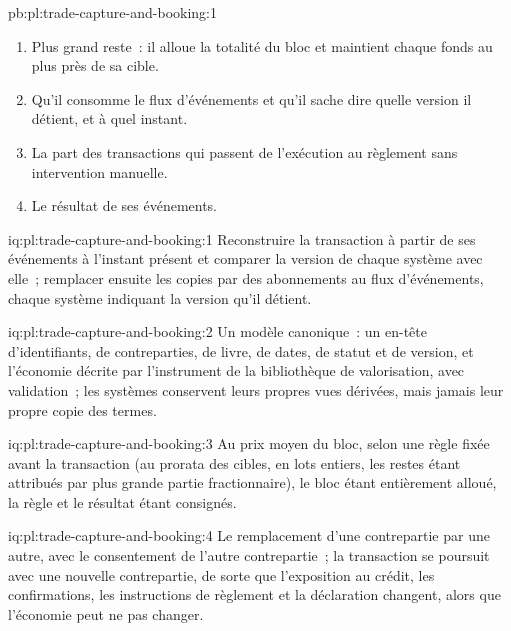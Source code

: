 \begin{solution}{pb:pl:trade-capture-and-booking:1}
\begin{enumerate}
le règlement et 109 swaps sur 200 pour lesquels ils divergent~; la distribution par événements, aucune. Le bloc de 9\,900 actions se répartit avec des restes de 0, 0
et $-100$ actions selon les règles du plus grand reste, des lots irréguliers aux plus grands et de l'arrondi de chacun, et des écarts à la cible d'au plus 50, 80 et 50 actions.
\item Plus grand reste~: il alloue la totalité du bloc et maintient chaque fonds au plus près de sa cible.
\item Qu'il consomme le flux d'événements et qu'il sache dire quelle version il détient, et à quel instant.
\item La part des transactions qui passent de l'exécution au règlement sans intervention manuelle.
\item Le résultat de ses événements.
\end{enumerate}
\end{solution}

\begin{solution}{iq:pl:trade-capture-and-booking:1}
Reconstruire la transaction à partir de ses événements à l'instant présent et comparer la version de chaque système avec elle~; remplacer ensuite les copies par des abonnements au flux d'événements,
chaque système indiquant la version qu'il détient.
\end{solution}

\begin{solution}{iq:pl:trade-capture-and-booking:2}
Un modèle canonique~: un en-tête d'identifiants, de contreparties, de livre, de dates, de statut et de version, et l'économie décrite par l'instrument de la bibliothèque de valorisation, avec
validation~; les systèmes conservent leurs propres vues dérivées, mais jamais leur propre copie des termes.
\end{solution}

\begin{solution}{iq:pl:trade-capture-and-booking:3}
Au prix moyen du bloc, selon une règle fixée avant la transaction (au prorata des cibles, en lots entiers, les restes étant attribués par plus grande partie fractionnaire), le
bloc étant entièrement alloué, la règle et le résultat étant consignés.
\end{solution}

\begin{solution}{iq:pl:trade-capture-and-booking:4}
Le remplacement d'une contrepartie par une autre, avec le consentement de l'autre contrepartie~; la transaction se poursuit avec une nouvelle contrepartie, de sorte que l'exposition au crédit,
les confirmations, les instructions de règlement et la déclaration changent, alors que l'économie peut ne pas changer.
\end{solution}

